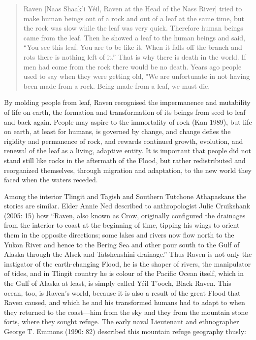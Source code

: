 \begin{quote}
Raven [Naas Shaak’i Yéil, Raven at the Head of the Nass River] tried to make human beings out of a rock and out of a leaf at the same time, but the rock was slow while the leaf was very quick. Therefore human beings came from the leaf. Then he showed a leaf to the human beings and said, ``You see this leaf. You are to be like it. When it falls off the branch and rots there is nothing left of it.'' That is why there is death in the world. If men had come from the rock there would be no death. Years ago people used to say when they were getting old, "We are unfortunate in not having been made from a rock. Being made from a leaf, we must die.
\end{quote}

By molding people from leaf, Raven recognised the impermanence and mutability of life on earth, the formation and transformation of its beings from seed to leaf and back again.  People may aspire to the immortality of rock (Kan 1989), but life on earth, at least for humans, is governed by change, and change defies the rigidity and permanence of rock, and rewards continued growth, evolution, and renewal of the leaf as a living, adaptive entity. It is important that people did not stand still like rocks in the aftermath of the Flood, but rather redistributed and reorganized themselves, through migration and adaptation, to the new world they faced when the waters receded.

Among the interior Tlingit and Tagish and Southern Tutchone Athapaskans the stories are similar. Elder Annie Ned described to anthropologist Julie Cruikshank (2005: 15) how “Raven, also known as Crow, originally configured the drainages from the interior to coast at the beginning of time, tipping his wings to orient them in the opposite directions; some lakes and rivers now flow north to the Yukon River and hence to the Bering Sea and other pour south to the Gulf of Alaska through the Alsek and Tatshenshini drainage.”  Thus Raven is not only the instigator of the earth-changing Flood, he is the shaper of rivers, the manipulator of tides, and in Tlingit country he is colour of the Pacific Ocean itself, which in the Gulf of Alaska at least, is simply called Yéil T'ooch, Black Raven.  This ocean, too, is Raven’s world, because it is also a result of the great Flood that Raven caused, and which he and his transformed humans had to adapt to when they returned to the coast—him from the sky and they from the mountain stone forts, where they sought refuge. The early naval Lieutenant and ethnographer George T. Emmons (1990: 82) described this mountain refuge geography thusly:

